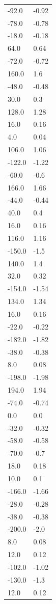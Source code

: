 \begin{longtable}{ll}
-92.0 & -0.92 \\
-78.0 & -0.78 \\
-18.0 & -0.18 \\
64.0 & 0.64 \\
-72.0 & -0.72 \\
160.0 & 1.6 \\
-48.0 & -0.48 \\
30.0 & 0.3 \\
128.0 & 1.28 \\
16.0 & 0.16 \\
4.0 & 0.04 \\
106.0 & 1.06 \\
-122.0 & -1.22 \\
-60.0 & -0.6 \\
166.0 & 1.66 \\
-44.0 & -0.44 \\
40.0 & 0.4 \\
16.0 & 0.16 \\
116.0 & 1.16 \\
-150.0 & -1.5 \\
140.0 & 1.4 \\
32.0 & 0.32 \\
-154.0 & -1.54 \\
134.0 & 1.34 \\
16.0 & 0.16 \\
-22.0 & -0.22 \\
-182.0 & -1.82 \\
-38.0 & -0.38 \\
8.0 & 0.08 \\
-198.0 & -1.98 \\
194.0 & 1.94 \\
-74.0 & -0.74 \\
0.0 & 0.0 \\
-32.0 & -0.32 \\
-58.0 & -0.58 \\
-70.0 & -0.7 \\
18.0 & 0.18 \\
10.0 & 0.1 \\
-166.0 & -1.66 \\
-28.0 & -0.28 \\
-38.0 & -0.38 \\
-200.0 & -2.0 \\
8.0 & 0.08 \\
12.0 & 0.12 \\
-102.0 & -1.02 \\
-130.0 & -1.3 \\
12.0 & 0.12 \\

\end{longtable}
